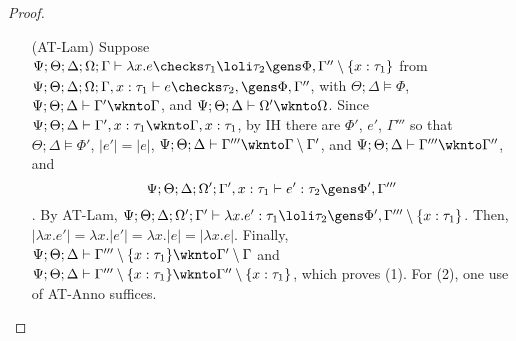 \begin{proof}
\begin{itemize}
   \item[(AT-Lam)] Suppose $\Psi ; \Theta ; \Delta ; \Omega ; \Gamma\vdash \lambda x.e \checks \tau_1 \loli \tau_2 \gens \Phi, \Gamma'' \setminus \{x : \tau_1\}$
  from $\Psi ; \Theta ; \Delta ; \Omega ; \Gamma, x : \tau_1 \vdash e \checks \tau_2, \gens \Phi, \Gamma''$, with $\Theta ; \Delta \vDash \Phi$, $\Psi ; \Theta ; \Delta \vdash \Gamma' \wknto \Gamma$, and $\Psi ; \Theta ; \Delta \vdash \Omega' \wknto \Omega$. Since $\Psi ; \Theta ; \Delta \vdash \Gamma',x:\tau_1 \wknto \Gamma, x: \tau_1$, by IH there are $\Phi'$, $e'$, $\Gamma'''$ so that
  $\Theta ; \Delta \vDash \Phi'$, $|e'| = |e|$, $\Psi ; \Theta ; \Delta \vdash \Gamma''' \wknto \Gamma \setminus \Gamma'$, and
  $\Psi ; \Theta ; \Delta \vdash \Gamma''' \wknto \Gamma''$, and $$\Psi ; \Theta ; \Delta ; \Omega' ; \Gamma',x : \tau_1 \vdash e' : \tau_2 \gens \Phi',\Gamma'''$$.
  By AT-Lam, $\Psi ; \Theta ; \Delta ; \Omega' ; \Gamma' \vdash \lambda x.e' : \tau_1 \loli \tau_2 \gens \Phi', \Gamma''' \setminus \{x : \tau_1\}$. Then, $|\lambda x.e'| = \lambda x. |e'| = \lambda x.|e| = |\lambda x.e|$. Finally, $\Psi ; \Theta ; \Delta \vdash \Gamma''' \setminus \{x : \tau_1\} \wknto \Gamma' \setminus \Gamma$
  and $\Psi ; \Theta ; \Delta \vdash \Gamma''' \setminus \{x : \tau_1\} \wknto \Gamma'' \setminus \{x : \tau_1\}$, which proves (1). For (2), one use of AT-Anno suffices.
  

\end{itemize}
\end{proof}
